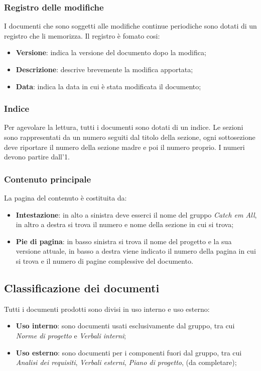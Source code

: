 \subsubsection{Registro delle modifiche}
I documenti che sono soggetti alle modifiche continue periodiche sono dotati di un registro che li memorizza. Il registro è fomato cosi:
\begin{itemize}
    \item \textbf{Versione}: indica la versione del documento dopo la modifica;
    \item \textbf{Descrizione}: descrive brevemente la modifica apportata;
    \item \textbf{Data}: indica la data in cui è stata modificata il documento;
\end{itemize}

\subsubsection{Indice}
Per agevolare la lettura, tutti i documenti sono dotati di un indice. Le sezioni sono rappresentati da un numero seguiti dal titolo della sezione, ogni sottosezione deve riportare il numero della sezione madre e poi il numero proprio. I numeri devono partire dall'1.

\subsubsection{Contenuto principale}
La pagina del contenuto è costituita da:
\begin{itemize}
    \item \textbf{Intestazione}: in alto a sinistra deve esserci il nome del gruppo \textit{Catch em All}, in altro a destra si trova il numero e nome della sezione in cui si trova;
    \item \textbf{Pie di pagina}: in basso sinistra si trova il nome del progetto e la sua versione attuale, in basso a destra viene indicato il numero della pagina in cui si trova e il numero di pagine complessive del documento.
\end{itemize}

\subsection{Classificazione dei documenti}
Tutti i documenti prodotti sono divisi in uso interno e uso esterno:
\begin{itemize}
    \item \textbf{Uso interno}: sono documenti usati esclusivamente dal gruppo, tra cui \textit{Norme di progetto} e \textit{Verbali interni};
    \item \textbf{Uso esterno}: sono documenti per i componenti fuori dal gruppo, tra cui \textit{Analisi dei requisiti}, \textit{Verbali esterni}, \textit{Piano di progetto}, (da completare);
\end{itemize}

